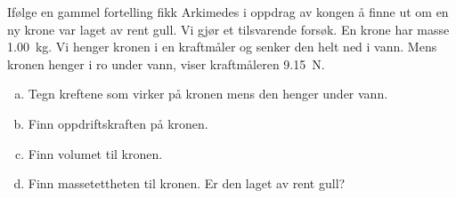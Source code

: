 %
Ifølge en gammel fortelling fikk Arkimedes i oppdrag av kongen å finne ut om en ny krone var laget av rent gull. Vi gjør et tilsvarende forsøk. En krone har masse \SI{1.00}{\kilo\gram}. Vi henger kronen i en kraftmåler og senker den helt ned i vann. Mens kronen henger i ro under vann, viser kraftmåleren \SI{9.15}{\newton}.
\begin{enumerate}[a)]
    \item Tegn kreftene som virker på kronen mens den henger under vann.
    \item Finn oppdriftskraften på kronen.
    \item Finn volumet til kronen.
    \item Finn massetettheten til kronen. Er den laget av rent gull?
\end{enumerate}
%
